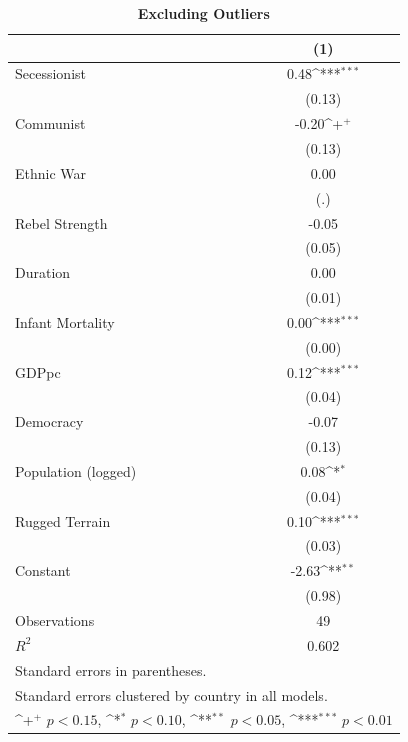 \documentclass[12pt, letterpaper]{article}
\begin{document}
\newpage
\begin{table}[htbp]\centering
\begin{small}
\def\sym#1{\ifmmode^{#1}\else\(^{#1}\)\fi}
\renewcommand\thetable{A.\Roman{table}}
\makeatletter
\def\myrow{}
\CT@everycr{\noalign{%
\global\let\CT@row@color\relax
\stepcounter{mym5}%
\ifnum\value{mym5}=2
  \gdef\myrow{\rowcolor{gray!50}}
\else\ifnum\value{mym5}=4
  \gdef\myrow{}
\fi\fi
}\myrow}
\caption{\textbf{Excluding Outliers }}
\label{table:outliers}
\begin{tabular}{l*{1}{c}}
\hline\hline
                    &\multicolumn{1}{c}{(1)}\\
\hline
Secessionist      &        0.48\sym{***}\\
                    &      (0.13)         \\
Communist           &       -0.20\sym{+}  \\
                    &      (0.13)         \\
Ethnic War          &        0.00         \\
                    &         (.)         \\
Rebel Strength      &       -0.05         \\
                    &      (0.05)         \\
Duration            &        0.00         \\
                    &      (0.01)         \\
Infant Mortality    &        0.00\sym{***}\\
                    &      (0.00)         \\
GDPpc               &        0.12\sym{***}\\
                    &      (0.04)         \\
Democracy           &       -0.07         \\
                    &      (0.13)         \\
Population (logged) &        0.08\sym{*}  \\
                    &      (0.04)         \\
Rugged Terrain      &        0.10\sym{***}\\
                    &      (0.03)         \\
Constant            &       -2.63\sym{**} \\
                    &      (0.98)         \\
\hline
Observations        &          49         \\
\(R^{2}\)           &       0.602         \\
\hline\hline
\multicolumn{2}{l}{\footnotesize Standard errors in parentheses.}\\
\multicolumn{2}{l}{\footnotesize Standard errors clustered by country in all models.}\\
\multicolumn{2}{l}{\footnotesize \sym{+} \(p<0.15\), \sym{*} \(p<0.10\), \sym{**} \(p<0.05\), \sym{***} \(p<0.01\)}\\
\end{tabular}
\end{small}
\end{table}
\end{document}
